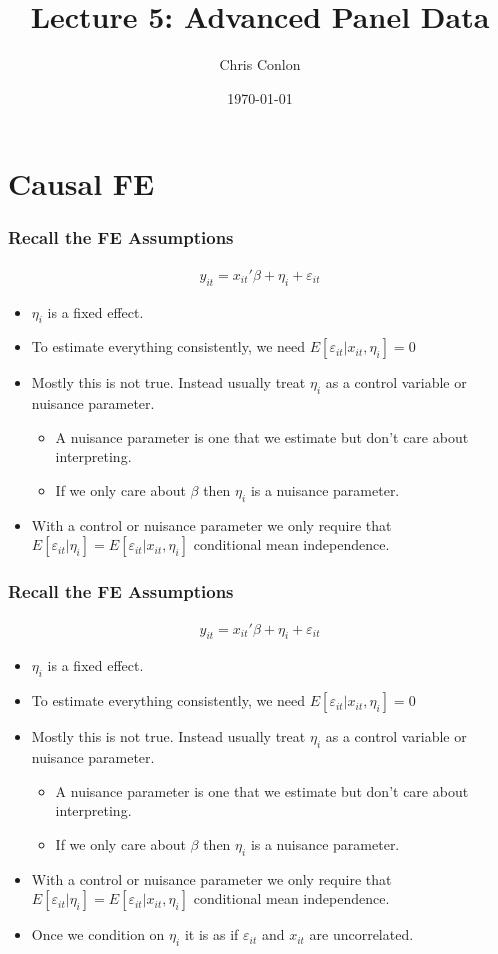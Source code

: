 \documentclass[aspectratio=169]{beamer}
\title{Lecture 5:  Advanced Panel Data}
\author{Chris Conlon }
\institute{NYU Stern }
\date{\today}
\begin{document}
\maketitle

\section*{Causal FE}

\begin{frame}
\frametitle{Recall the FE Assumptions}
\begin{eqnarray*}
y_{it} =  x_{it}'\beta + \eta_i + \varepsilon_{it}
\end{eqnarray*}
\begin{itemize}
\item $\eta_i$ is a \alert{fixed effect}.
\item To estimate everything consistently, we need $E[ \varepsilon_{it} | x_{it}, \eta_i]=0$
\item Mostly this is not true. Instead usually treat $\eta_i$ as a \alert{control variable} or \alert{nuisance parameter}.
\begin{itemize}
\item A nuisance parameter is one that we estimate but don't care about interpreting.
\item If we only care about $\beta$ then $\eta_i$ is a nuisance parameter.
\end{itemize}
\item With a control or nuisance parameter we only require that $E[ \varepsilon_{it} | \eta_{i}]=E[ \varepsilon_{it} | x_{it}, \eta_i]$ \alert{conditional mean independence}.
\end{itemize}
\end{frame}

\begin{frame}
\frametitle{Recall the FE Assumptions}
\begin{eqnarray*}
y_{it} =  x_{it}'\beta + \eta_i + \varepsilon_{it}
\end{eqnarray*}
\begin{itemize}
\item $\eta_i$ is a \alert{fixed effect}.
\item To estimate everything consistently, we need $E[ \varepsilon_{it} | x_{it}, \eta_i]=0$
\item Mostly this is not true. Instead usually treat $\eta_i$ as a \alert{control variable} or \alert{nuisance parameter}.
\begin{itemize}
\item A nuisance parameter is one that we estimate but don't care about interpreting.
\item If we only care about $\beta$ then $\eta_i$ is a nuisance parameter.
\end{itemize}
\item With a control or nuisance parameter we only require that $E[ \varepsilon_{it} | \eta_{i}]=E[ \varepsilon_{it} | x_{it}, \eta_i]$ \alert{conditional mean independence}.
\item Once we condition on $\eta_i$ it is as if $\varepsilon_{it}$ and $x_{it}$ are uncorrelated.
\end{itemize}
\end{frame}
\end{document}
